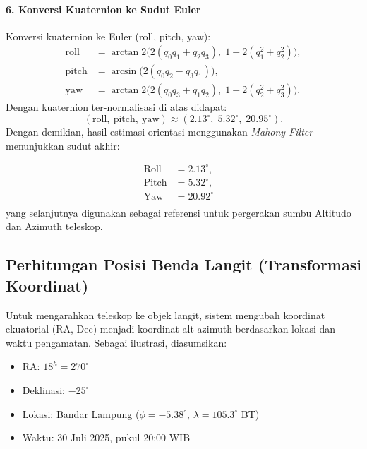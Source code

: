 \paragraph{6. Konversi Kuaternion ke Sudut Euler}
Konversi kuaternion ke Euler (roll, pitch, yaw):
{\setlength{\abovedisplayskip}{8pt}%
	\setlength{\belowdisplayskip}{8pt}%
\[
\begin{split}
\text{roll} &= \arctan2\big(2(q_0 q_1 + q_2 q_3),\; 1 - 2(q_1^2 + q_2^2)\big),\\[4pt]
\text{pitch} &= \arcsin\big(2(q_0 q_2 - q_3 q_1)\big),\\[4pt]
\text{yaw} &= \arctan2\big(2(q_0 q_3 + q_1 q_2),\; 1 - 2(q_2^2 + q_3^2)\big).
\end{split}
\]}
Dengan kuaternion ter-normalisasi di atas didapat:
{\setlength{\abovedisplayskip}{8pt}%
	\setlength{\belowdisplayskip}{8pt}%
\[
(\text{roll},\ \text{pitch},\ \text{yaw}) \approx (2.13^\circ,\; 5.32^\circ,\; 20.95^\circ).
\]}
Dengan demikian, hasil estimasi orientasi menggunakan \textit{Mahony Filter} menunjukkan sudut akhir:


{\setlength{\abovedisplayskip}{8pt}%
\setlength{\belowdisplayskip}{8pt}%
\[
\begin{split}
	\text{Roll} &= 2.13^\circ,\quad \\
	\text{Pitch} &= 5.32^\circ,\quad \\
	\text{Yaw} &= 20.92^\circ \\
\end{split}
\]}
yang selanjutnya digunakan sebagai referensi untuk pergerakan sumbu Altitudo dan Azimuth teleskop.

\subsection{Perhitungan Posisi Benda Langit (Transformasi Koordinat)}

Untuk mengarahkan teleskop ke objek langit, sistem mengubah koordinat ekuatorial (RA, Dec) menjadi koordinat alt-azimuth berdasarkan lokasi dan waktu pengamatan. Sebagai ilustrasi, diasumsikan:

\begin{itemize}[noitemsep]
	\item RA: $18^h = 270^\circ$
	\item Deklinasi: $-25^\circ$
	\item Lokasi: Bandar Lampung ($\phi = -5.38^\circ$, $\lambda = 105.3^\circ$ BT)
	\item Waktu: 30 Juli 2025, pukul 20:00 WIB
\end{itemize}

